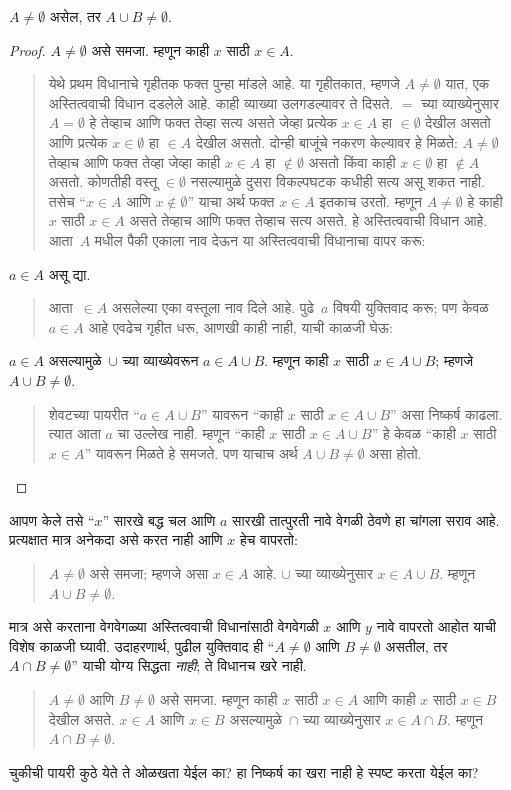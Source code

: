 \documentclass[../../../include/open-logic-section]{subfiles}
\begin{document}
\begin{prop}
$A \neq \emptyset$ असेल, तर $A \cup B \neq \emptyset$.
\end{prop}

\begin{proof}
$A \neq \emptyset$ असे समजा. म्हणून काही $x$ साठी $x \in A$.
\begin{quote}
येथे प्रथम विधानाचे गृहीतक फक्त पुन्हा मांडले आहे. या गृहीतकात, म्हणजे $A \neq \emptyset$ यात, एक अस्तित्ववाची विधान दडलेले आहे. काही व्याख्या उलगडल्यावर ते दिसते. $=$ च्या व्याख्येनुसार $A = \emptyset$ हे तेव्हाच आणि फक्त तेव्हा सत्य असते जेव्हा प्रत्येक $x \in A$ हा $\in \emptyset$ देखील असतो आणि प्रत्येक $x \in \emptyset$ हा $\in A$ देखील असतो. दोन्ही बाजूंचे नकरण केल्यावर हे मिळते: $A \neq \emptyset$ तेव्हाच आणि फक्त तेव्हा जेव्हा काही $x \in A$ हा $\notin \emptyset$ असतो किंवा काही $x \in \emptyset$ हा $\notin A$ असतो. कोणतीही वस्तू $\in \emptyset$ नसल्यामुळे दुसरा विकल्पघटक कधीही सत्य असू शकत नाही. तसेच “$x \in A$ आणि $x \notin \emptyset$” याचा अर्थ फक्त $x \in A$ इतकाच उरतो. म्हणून $A \neq \emptyset$ हे काही $x$ साठी $x \in A$ असते तेव्हाच आणि फक्त तेव्हाच सत्य असते. हे अस्तित्ववाची विधान आहे. आता~$A$ मधील पैकी एकाला नाव देऊन या अस्तित्ववाची विधानाचा वापर करू:
\end{quote}
$a \in A$ असू द्या.
\begin{quote}
आता~$\in A$ असलेल्या एका वस्तूला नाव दिले आहे. पुढे~$a$ विषयी युक्तिवाद करू; पण केवळ $a \in A$ आहे एवढेच गृहीत धरू, आणखी काही नाही, याची काळजी घेऊ:
\end{quote}
$a \in A$ असल्यामुळे~$\cup$ च्या व्याख्येवरून $a \in A \cup B$. म्हणून काही $x$ साठी $x \in A \cup B$; म्हणजे $A \cup B \neq \emptyset$.
\begin{quote}
शेवटच्या पायरीत “$a \in A \cup B$” यावरून “काही $x$ साठी $x \in A \cup B$” असा निष्कर्ष काढला. त्यात आता $a$ चा उल्लेख नाही. म्हणून “काही $x$ साठी $x \in A \cup B$” हे केवळ “काही $x$ साठी $x \in A$” यावरून मिळते हे समजते. पण याचाच अर्थ $A \cup B \neq \emptyset$ असा होतो.
\end{quote}
\end{proof}

आपण केले तसे “$x$” सारखे बद्ध चल आणि $a$ सारखी तात्पुरती नावे वेगळी ठेवणे हा चांगला सराव आहे. प्रत्यक्षात मात्र अनेकदा असे करत नाही आणि $x$ हेच वापरतो:
\begin{quote}
$A \neq \emptyset$ असे समजा; म्हणजे असा $x \in A$ आहे. $\cup$ च्या व्याख्येनुसार $x \in A \cup B$. म्हणून $A \cup B \neq \emptyset$.
\end{quote}
मात्र असे करताना वेगवेगळ्या अस्तित्ववाची विधानांसाठी वेगवेगळी $x$ आणि $y$ नावे वापरतो आहोत याची विशेष काळजी घ्यावी. उदाहरणार्थ, पुढील युक्तिवाद ही “$A \neq \emptyset$ आणि $B \neq \emptyset$ असतील, तर $A \cap B \neq \emptyset$” याची योग्य सिद्धता \emph{नाही}; ते विधानच खरे नाही.
\begin{quote}
$A \neq \emptyset$ आणि $B \neq \emptyset$ असे समजा. म्हणून काही $x$ साठी $x \in A$ आणि काही $x$ साठी $x \in B$ देखील असते. $x \in A$ आणि $x \in B$ असल्यामुळे~$\cap$ च्या व्याख्येनुसार $x \in A \cap B$. म्हणून $A \cap B \neq \emptyset$.
\end{quote}
चुकीची पायरी कुठे येते ते ओळखता येईल का? हा निष्कर्ष का खरा नाही हे स्पष्ट करता येईल का?
\end{document}
